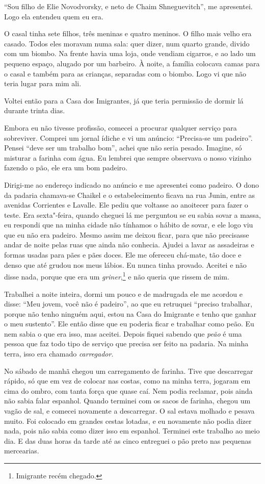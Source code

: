 ``Sou filho de Elie Novodvorsky, e neto de Chaim Shneguevitch'', me
apresentei. Logo ela entendeu quem eu era.

O casal tinha sete filhos, três meninas e quatro meninos. O filho mais
velho era casado. Todos eles moravam numa sala: quer dizer, num quarto
grande, divido com um biombo. Na frente havia uma loja, onde vendiam cigarros, e ao lado um pequeno espaço, alugado por um
barbeiro. À noite, a família colocava camas para o casal e também para as
crianças, separadas com o biombo. Logo vi que não teria lugar para
mim ali.

Voltei então para a Casa dos Imigrantes, já que teria permissão de dormir
lá durante trinta dias.

Embora eu não tivesse profissão, comecei a procurar qualquer
serviço para sobreviver. Comprei um jornal ídiche e vi um anúncio:
``Precisa-se um padeiro''. Pensei ``deve ser um trabalho bom'', achei
que não seria pesado. Imagine, só misturar a farinha com água. Eu
lembrei que sempre observava o nosso vizinho fazendo o pão, ele era um
bom padeiro.

Dirigi-me ao endereço indicado no anúncio e me apresentei como padeiro.
O dono da padaria chamava-se Chaikel e o estabelecimento ficava na rua
Junin, entre as avenidas Corrientes e Lavalle. Ele pediu que voltasse ao
anoitecer para fazer o teste. Era sexta"-feira, quando cheguei lá me
perguntou se eu sabia sovar a massa, eu respondi que na minha cidade não
tínhamos o hábito de sovar, e ele logo viu que eu não era padeiro.
Mesmo assim me deixou ficar, para que não precisasse andar de noite pelas ruas que
ainda não conhecia. Ajudei a lavar as assadeiras e formas usadas para pães e pães doces. Ele me ofereceu chá-mate, tão doce e denso que até grudou nos
meus lábios. Eu nunca tinha provado. Aceitei e não disse nada, porque
que era um \textit{griner},\footnote{Imigrante recém chegado.} e não queria
que rissem de mim.

Trabalhei a noite inteira, dormi um pouco e de madrugada ele me acordou
e disse: ``Meu jovem, você não é padeiro'', ao que eu retruquei ``preciso
trabalhar, porque não tenho ninguém aqui, estou na Casa do Imigrante e
tenho que ganhar o meu sustento''. Ele então disse que eu poderia ficar
e trabalhar como peão. Eu nem sabia o que era isso, mas aceitei. Depois
fiquei sabendo que \textit{peão} é uma pessoa que faz todo tipo de serviço
que precisa ser feito na padaria. Na minha terra, isso era chamado \textit{carregador}.

No sábado de manhã chegou um carregamento de farinha. Tive que descarregar
rápido, só que em vez de colocar nas costas, como na minha terra,
jogaram em cima do ombro, com tanta força que quase caí. Nem podia
reclamar, pois ainda não sabia falar espanhol. Quando terminei com os
sacos de farinha, chegou um vagão de sal, e comecei novamente a
descarregar. O sal estava molhado e pesava muito. Foi colocado em
grandes cestas lotadas, e eu novamente não podia dizer nada, pois não
sabia como dizer isso em espanhol. Terminei este trabalho ao meio dia. E das duas horas da tarde até as cinco entreguei o pão preto nas pequenas mercearias. 

